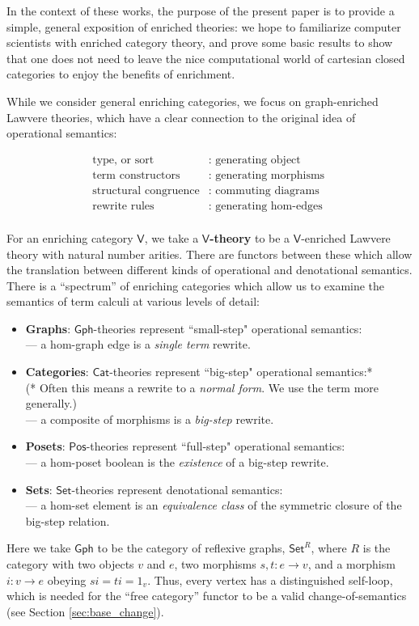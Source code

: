 \documentclass{amsart}
\theoremstyle{definition}
\newcommand{\Gph}{\mathsf{Gph}}
\newcommand{\Set}{\mathsf{Set}}
\newcommand{\Cat}{\mathsf{Cat}}
\newcommand{\Pos}{\mathsf{Pos}}
\newcommand{\V}{\mathsf{V}}
\newcommand{\maps}{\colon}
\begin{document}
In the context of these works, the purpose of the present paper is to provide a simple, general exposition of enriched theories: we hope to familiarize computer scientists with enriched category theory, and prove some basic results to show that one does not need to leave the nice computational world of cartesian closed categories to enjoy the benefits of enrichment.

While we consider general enriching categories, we focus on graph-enriched Lawvere theories, which have a clear connection to the original idea of operational semantics:

\[\begin{array}{rl}
\text{type, or sort} & \text{: generating object }\\
\text{term constructors} & \text{: generating morphisms }\\
\text{structural congruence} & \text{: commuting diagrams}\\
\text{rewrite rules} & \text{: generating hom-edges}\\
\end{array}\]

For an enriching category $\V$, we take a \textbf{$\V$-theory} to be a $\V$-enriched Lawvere theory with natural number arities. There are functors between these which allow the translation between different kinds of operational and denotational semantics.  There is a ``spectrum'' of enriching categories which allow us to examine the semantics of term calculi at various levels of detail:

\begin{itemize}
\item 
\textbf{Graphs}: $\Gph$-theories represent ``small-step" operational semantics: \\ --- a hom-graph edge is a \textit{single term} rewrite.
\item
\textbf{Categories}: $\Cat$-theories represent ``big-step" operational semantics:*\\ (* Often this means a rewrite to a \textit{normal form}. We use the term more generally.)\\ --- a composite of morphisms is a \textit{big-step} rewrite. 
\item
\textbf{Posets}: $\Pos$-theories represent ``full-step" operational semantics:\\ --- a hom-poset boolean is the \textit{existence} of a big-step rewrite.
\item
\textbf{Sets}: $\Set$-theories represent denotational semantics: \\ --- a hom-set element is an \textit{equivalence class} of the symmetric closure of the big-step relation.
\end{itemize}
Here we take $\Gph$ to be the category of reflexive graphs, $\Set^R$, where $R$ is the category with two objects $v$ and $e$, two morphisms $s,t \maps e \to v$, and a morphism $i \maps v \to e$ obeying $si = ti = 1_v$.  Thus, every vertex has a distinguished self-loop, which is needed for the ``free category'' functor to be a valid change-of-semantics (see Section \ref{sec:base_change}). 
\end{document}
